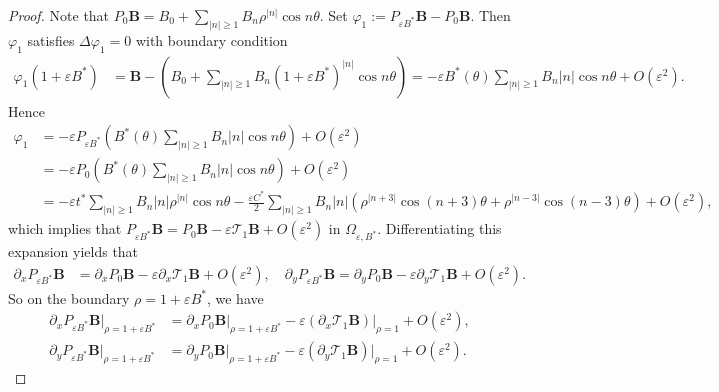 \documentclass[12pt,reqno]{amsart}
\numberwithin{equation}{section}
\theoremstyle{definition}
\theoremstyle{remark}
\begin{document}
\begin{proof}

Note that $ P_0  \textbf{B}=B_0+ \sum_{|n|\ge1}B_n\rho^{|n|}\cos n\theta. $  
Set $\varphi_1:=P_{\varepsilon B^*}  \textbf{B}-P_0  \textbf{B}$. Then $ \varphi_1 $ satisfies $ \Delta\varphi_1 =0    $ with boundary condition
\begin{equation*}
\begin{split}
\varphi_1(1+\varepsilon B^*)
&=  \textbf{B}-\left(B_0+\sum_{|n|\ge1}B_n(1+\varepsilon B^*)^{|n|}\cos n\theta\right)  =-\varepsilon B^*(\theta)\sum_{|n|\ge1}B_n|n|\cos n\theta+O(\varepsilon^2).
\end{split}
\end{equation*}
Hence
\begin{align*}
\varphi_1
&=-\varepsilon P_{\varepsilon B^*}\left( B^*(\theta)\sum_{|n|\ge1}B_n|n|\cos n\theta\right)+O(\varepsilon^2) \\
&=-\varepsilon  P_{0}\left( B^*(\theta)\sum_{|n|\ge1}B_n|n|\cos n\theta \right)  +O(\varepsilon^2) \\
&=-\varepsilon t^*\sum_{|n|\ge1}B_n|n|\rho^{|n|}\cos n\theta   -\frac{\varepsilon C^*}{2}\sum_{|n|\ge1}B_n|n|\left(\rho^{|n+3|}\cos(n+3)\theta+\rho^{|n-3|}\cos(n-3)\theta\right)+O(\varepsilon^2),
\end{align*}
which implies that  $ P_{\varepsilon B^*}  \textbf{B}=P_0  \textbf{B}-\varepsilon \mathcal{T}_1  \textbf{B}+O(\varepsilon^2)
 $  in $ \varOmega_{\varepsilon,B^*}. $
Differentiating this expansion yields that
\begin{align*}
\partial_xP_{\varepsilon B^*}  \textbf{B}
&=\partial_xP_0  \textbf{B}-\varepsilon\partial_x \mathcal{T}_1  \textbf{B}+O(\varepsilon^2), \quad
\partial_yP_{\varepsilon B^*}  \textbf{B}
=\partial_yP_0  \textbf{B}-\varepsilon\partial_y \mathcal{T}_1  \textbf{B}+O(\varepsilon^2).
\end{align*}
So on the boundary $ \rho=1+\varepsilon B^* $,  we have
\begin{equation}\label{eq: px-py-expan}
\begin{split}
\partial_xP_{\varepsilon B^*}  \textbf{B}\big|_{\rho=1+\varepsilon B^*}
&=\partial_xP_0  \textbf{B}\big|_{\rho=1+\varepsilon B^*}
-\varepsilon\left(\partial_x  \mathcal{T}_1  \textbf{B}\right)\big|_{\rho=1}+O(\varepsilon^2), \\
\partial_yP_{\varepsilon B^*}  \textbf{B}\big|_{\rho=1+\varepsilon B^*}
&=\partial_yP_0  \textbf{B}\big|_{\rho=1+\varepsilon B^*}
-\varepsilon\left(\partial_y  \mathcal{T}_1  \textbf{B}\right)\big|_{\rho=1}+O(\varepsilon^2).

\end{split}
\end{equation}
\end{proof}
\end{document}
